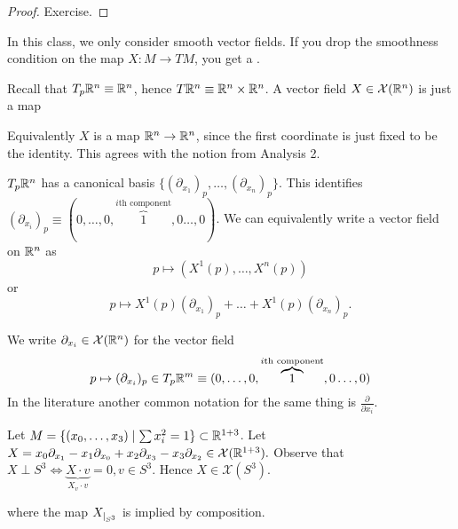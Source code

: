\begin{proof}
    Exercise.
\end{proof}

\begin{remark}
    In this class, we only consider smooth vector fields. If you drop the smoothness condition on the map \(X:M\to TM\),
    you get a . 
\end{remark}

\begin{example}
    Recall that \(T_p\mathbb{R}^n\equiv \mathbb{R}^n\), hence \(T\mathbb{R}^n\equiv \mathbb{R}^n\times \mathbb{R}^n\).
    A vector field \(X\in\mathcal{X}(\mathbb{R}^n)\) is just a map  
    \begin{center}
    \end{center}
    Equivalently \(X\) is a map \(\mathbb{R}^n\to\mathbb{R}^n\), since the first coordinate is just fixed to be the 
    identity. This agrees with the notion from Analysis 2. 
\end{example}

\begin{remark}
    \(T_p\mathbb{R}^n\) has a canonical basis \(\{(\partial_{x_1})_p,\dots,(\partial_{x_n})_p\}\). This identifies 
    \((\partial_{x_i})_p\equiv (0,\dots,0,\overbrace{1}^{i\text{th component}},0\dots,0)\). We can equivalently 
    write a vector field on \(\mathbb{R}^n\) as \[p\mapsto (X^1(p),\dots,X^n(p))\]
    or 
    \[p\mapsto X^1(p)(\partial_{x_1})_p+\dots+X^1(p)(\partial_{x_n})_p.\]
\end{remark}

 We write \(\partial_{x_i}\in\mathcal{X}(\mathbb{R}^n)\) for the vector field 
\[p \mapsto (\partial_{x_i})_p\in T_p\mathbb{R}^m\equiv (0,\dots,0,\overbrace{1}^{i\text{th component}},0\dots,0)\]
In the literature another common notation for the same thing is \(\frac{\partial}{\partial x_i}\).

\begin{example}
    Let \(M=\{(x_0,\dots,x_3)\mid \sum x_i^2=1\}\subset\mathbb{R}^{1+3}\). Let \(X=x_0\partial_{x_1}-x_1\partial_{x_0}+x_2\partial_{x_3}-x_3\partial_{x_2}\in \mathcal{X}(\mathbb{R}^{1+3}).\)
    Observe that \(X\perp S^3 \iff \underbrace{X\cdot v}_{X_v\cdot v} = 0, v\in S^3.\) Hence \(X \in \mathcal{X}(S^3)\).
    \begin{center}
    \end{center}
    where the map \(X_{|_{S^3}}\) is implied by composition.
\end{example}

